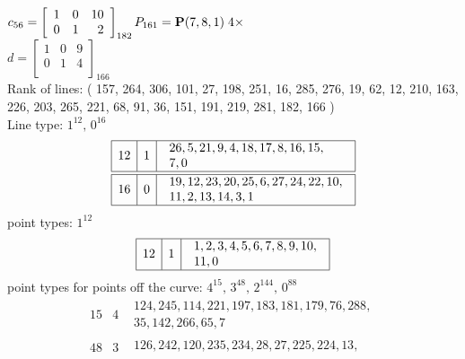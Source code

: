 \documentclass{article}
\newcommand{\bP}{{\bf P}}
\begin{document}
{$
c_{56} = 
\left[
\begin{array}{*{3}{r}}
1 & 0 & 10\\
0 & 1 & 2\\
\end{array}
\right]
_{182}
P_{161}=\bP( 7, 8, 1 )\;4 \times $\\
$
d = 
\left[
\begin{array}{*{3}{r}}
1 & 0 & 9\\
0 & 1 & 4\\
\end{array}
\right]
_{166}
$\\
Rank of lines: ( 157, 264, 306, 101, 27, 198, 251, 16, 285, 276, 19, 62, 12, 210, 163, 226, 203, 265, 221, 68, 91, 36, 151, 191, 219, 281, 182, 166 )\\
Line type: $
1^{12},\,0^{16}$\\
$$
\begin{array}{|r|r|l|}
\hline
12 & 1 & \begin{array}{l}
26, 5, 21, 9, 4, 18, 17, 8, 16, 15, \\
7, 0\end{array}
\\
\hline
\hline
16 & 0 & \begin{array}{l}
19, 12, 23, 20, 25, 6, 27, 24, 22, 10, \\
11, 2, 13, 14, 3, 1\end{array}
\\
\hline
\end{array}
$$
point types: $
1^{12}$\\
$$
\begin{array}{|r|r|l|}
\hline
12 & 1 & \begin{array}{l}
1, 2, 3, 4, 5, 6, 7, 8, 9, 10, \\
11, 0\end{array}
\\
\hline
\end{array}
$$
point types for points off the curve: $
4^{15},\,3^{48},\,2^{144},\,0^{88}$\\
$$
\begin{array}{|r|r|l|}
\hline
15 & 4 & \begin{array}{l}
124, 245, 114, 221, 197, 183, 181, 179, 76, 288, \\
35, 142, 266, 65, 7\end{array}
\\
\hline
\hline
48 & 3 & \begin{array}{l}
126, 242, 120, 235, 234, 28, 27, 225, 224, 13, \\

\end{array}
\end{array}$$}
\end{document}
